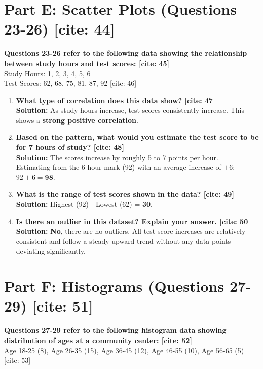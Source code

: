 \documentclass[11pt]{article}
\begin{document}
\section*{Part E: Scatter Plots (Questions 23-26) [cite: 44]}

\noindent \textbf{Questions 23-26 refer to the following data showing the relationship between study hours and test scores: [cite: 45]} \\
Study Hours: 1, 2, 3, 4, 5, 6 \\ Test Scores: 62, 68, 75, 81, 87, 92 [cite: 46]

\begin{enumerate}[resume]
    \item \textbf{What type of correlation does this data show? [cite: 47]} \\
    \textbf{Solution:} As study hours increase, test scores consistently increase. This shows a \textbf{strong positive correlation}.
    
    \item \textbf{Based on the pattern, what would you estimate the test score to be for 7 hours of study? [cite: 48]} \\
    \textbf{Solution:} The scores increase by roughly 5 to 7 points per hour. \\
    Estimating from the 6-hour mark (92) with an average increase of $+6$: $92 + 6 = \textbf{98}$.
    
    \item \textbf{What is the range of test scores shown in the data? [cite: 49]} \\
    \textbf{Solution:} Highest (92) - Lowest (62) = \textbf{30}.
    
    \item \textbf{Is there an outlier in this dataset? Explain your answer. [cite: 50]} \\
    \textbf{Solution:} \textbf{No}, there are no outliers. All test score increases are relatively consistent and follow a steady upward trend without any data points deviating significantly.
\end{enumerate}

\section*{Part F: Histograms (Questions 27-29) [cite: 51]}

\noindent \textbf{Questions 27-29 refer to the following histogram data showing distribution of ages at a community center: [cite: 52]} \\
Age 18-25 (8), Age 26-35 (15), Age 36-45 (12), Age 46-55 (10), Age 56-65 (5) [cite: 53]
\end{document}
